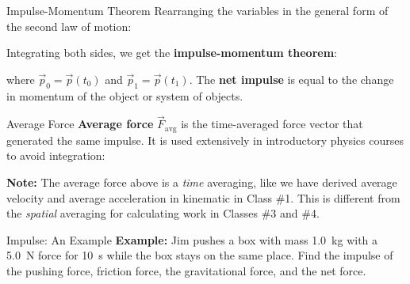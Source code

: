 \documentclass[12pt,compress,aspectratio=169]{beamer}
\begin{document}
\begin{frame}{Impulse-Momentum Theorem}
  Rearranging the variables in the general form of the second law of motion:
  

  Integrating both sides, we get the \textbf{impulse-momentum theorem}:
 
  
  where $\vec p_0=\vec p(t_0)$ and $\vec p_1=\vec p(t_1)$. The
  \textbf{net impulse} is equal to the change in momentum of the object or
  system of objects.
\end{frame}



\begin{frame}{Average Force}
  \textbf{Average force} $\vec F_\text{avg}$ is the time-averaged force vector
  that generated the same impulse. It is used extensively in introductory
  physics courses to avoid integration:


  \vspace{.2in}\textbf{Note:} The average force above is a \emph{time}
  averaging, like we have derived average velocity and average acceleration in
  kinematic in Class \#1. This is different from the \emph{spatial} averaging
  for calculating work in Classes \#3 and \#4.
\end{frame}



\begin{frame}{Impulse: An Example}
  \textbf{Example:} Jim pushes a box with mass \SI{1.0}{\kilo\gram} with a
  \SI{5.0}{\newton} force for \SI{10}{\second} while the box stays on the same
  place. Find the impulse of the pushing force, friction force, the
  gravitational force, and the net force.
\end{frame}



\end{document}

